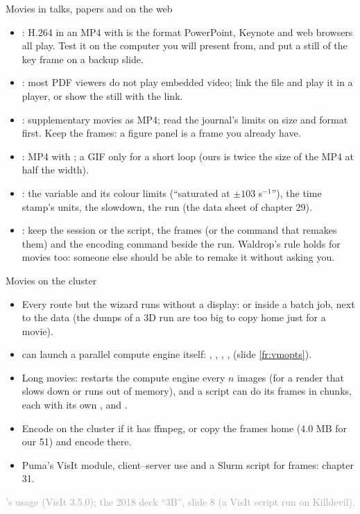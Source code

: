 \documentclass[aspectratio=169,11pt]{beamer}
\newcommand{\sourcecredit}[1]{\vfill\begin{flushright}\tiny\textcolor{DarkGray}{#1}\end{flushright}}
\begin{document}
\begin{frame}{Movies in talks, papers and on the web}
\label{fr:talks}
\footnotesize
\begin{itemize}\setlength{\itemsep}{1pt}
  \item {}: H.264 in an MP4 with  is the format PowerPoint, Keynote and web browsers all play. Test it on the computer you will present from, and put a still of the key frame on a backup slide.
  \item {}: most PDF viewers do not play embedded video; link the file and play it in a player, or show the still with the link.
  \item {}: supplementary movies as MP4; read the journal's limits on size and format first. Keep the frames: a figure panel is a frame you already have.
  \item {}: MP4 with ; a GIF only for a short loop (ours is twice the size of the MP4 at half the width).
  \item {}: the variable and its colour limits (``saturated at $\pm103$ s$^{-1}$''), the time stamp's units, the slowdown, the run (the data sheet of chapter 29).
  \item {}: keep the session or the script, the frames (or the command that remakes them) and the encoding command beside the run. Waldrop's rule holds for movies too: someone else should be able to remake it without asking you.
\end{itemize}
\end{frame}

\begin{frame}{Movies on the cluster}
\label{fr:cluster}
\footnotesize
\begin{itemize}\setlength{\itemsep}{1pt}
  \item Every route but the wizard runs without a display:  or  inside a batch job, next to the data (the dumps of a 3D run are too big to copy home just for a movie).
  \item {} can launch a parallel compute engine itself: , , , ,  (slide \ref{fr:vmopts}).
  \item Long movies:  restarts the compute engine every $n$ images (for a render that slows down or runs out of memory), and a script can do its frames in chunks, each with its own ,  and .
  \item Encode on the cluster if it has ffmpeg, or copy the frames home (4.0 MB for our 51) and encode there.
  \item Puma's VisIt module, client--server use and a Slurm script for frames: chapter 31.
\end{itemize}
\sourcecredit{'s usage (VisIt 3.5.0); the 2018 deck ``3B'', slide 8 (a VisIt script run on Killdevil).}
\end{frame}
\end{document}
